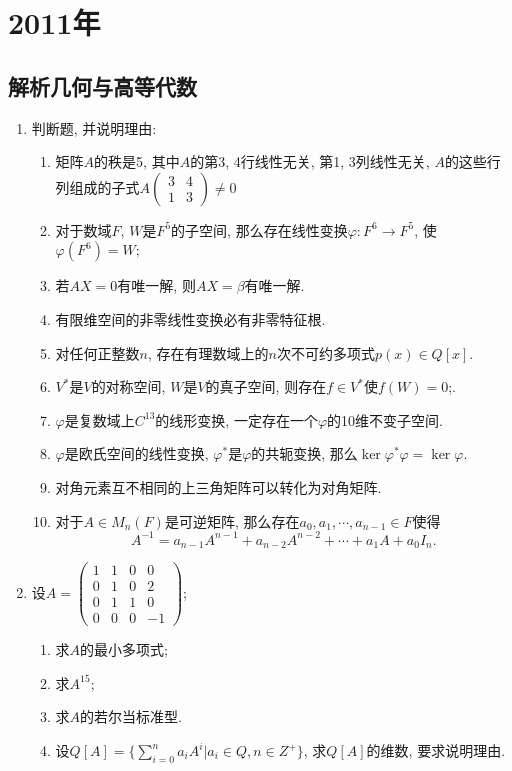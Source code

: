 \documentclass[12pt,a4paper,openany]{book}
\begin{document}
\section{2011年}
\subsection{解析几何与高等代数}
\begin{enumerate}
\item 判断题, 并说明理由:
\begin{enumerate}
\item 矩阵$A$的秩是5, 其中$A$的第3, 4行线性无关, 第1, 3列线性无关, $A$的这些行列组成的子式$A\begin{pmatrix} 3 & 4 \\ 1 & 3 \end{pmatrix} \neq 0$

\item 对于数域$F$, $W$是$F^5$的子空间, 那么存在线性变换$\varphi: F^6 \rightarrow F^5$, 使$\varphi(F^6) = W$;

\item 若$AX = 0$有唯一解, 则$AX = \beta$有唯一解.

\item 有限维空间的非零线性变换必有非零特征根.

\item 对任何正整数$n$, 存在有理数域上的$n$次不可约多项式$p(x) \in Q[x]$.

\item $V^*$是$V$的对称空间, $W$是$V$的真子空间, 则存在$f \in V^*$使$f(W) = 0$;.

\item $\varphi$是复数域上$C^{13}$的线形变换, 一定存在一个$\varphi$的10维不变子空间.

\item $\varphi$是欧氏空间的线性变换, $\varphi^*$是$\varphi$的共轭变换, 那么$\ker{\varphi^*\varphi} = \ker{\varphi}$.

\item 对角元素互不相同的上三角矩阵可以转化为对角矩阵.

\item 对于$A \in M_n(F)$是可逆矩阵, 那么存在$a_0, a_1, \cdots, a_{n-1} \in F$使得
\[
A^{-1} = a_{n-1}A^{n-1} + a_{n-2}A^{n-2} + \cdots + a_1A + a_0I_n.
\]

\end{enumerate}

\item 设$A = \begin{pmatrix} 1 & 1 & 0 & 0 \\ 0 & 1 & 0 & 2 \\ 0 & 1 & 1 & 0 \\ 0 & 0 & 0 & -1 \end{pmatrix}$;
\begin{enumerate}
\item 求$A$的最小多项式;
\item 求$A^{15}$;
\item 求$A$的若尔当标准型.
\item 设$Q[A] = \{ \sum\limits_{i=0}^{n}{a_iA^i} | a_i \in Q, n \in Z^{+} \}$, 求$Q[A]$的维数, 要求说明理由.
\end{enumerate}


\end{enumerate}
\end{document}
